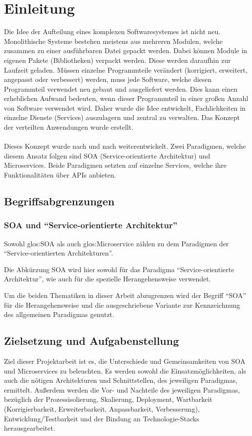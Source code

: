 \chapter{Einleitung}
\label{chap:Einleitung}
Die Idee der Aufteilung eines komplexen Softwaresystemes ist nicht neu. Monolithische Systeme bestehen meistens aus mehreren Modulen, welche zusammen zu einer ausführbaren Datei gepackt werden. Dabei können Module in eigenen Pakete (Bibliotheken) verpackt werden. Diese werden daraufhin zur Laufzeit geladen. Müssen einzelne Programmteile verändert (korrigiert, erweitert, angepasst oder verbessert) werden, muss jede Software, welche diesen Programmteil verwendet neu gebaut und ausgeliefert werden. Dies kann einen erheblichen Aufwand bedeuten, wenn dieser Programmteil in einer großen Anzahl von Software verwendet wird. Daher wurde die Idee entwickelt, Fachlichkeiten in einzelne Dienste (Services) auszulagern und zentral zu verwalten. Das Konzept der verteilten Anwendungen wurde erstellt.
\\\\
Dieses Konzept wurde nach und nach weiterentwickelt. Zwei Paradigmen, welche diesem Ansatz folgen sind SOA (Service-orientierte Architektur) und Microservices. Beide Paradigmen setzten auf einzelne Services, welche ihre Funktionalitäten über APIs anbieten.

\section{Begriffsabgrenzungen}
\label{sec:Begriffsabgrenzungen}

\subsection*{SOA und "`Service-orientierte Architektur"'}
Sowohl \gls{glos:SOA} als auch \gls{glos:Microservice} zählen zu dem Paradigmen der "`Service-orientierten Architekturen"'.

Die Abkürzung SOA wird hier sowohl für das Paradigma "`Service-orientierte Architektur"', wie auch für die spezielle Herangehensweise verwendet.

Um die beiden Thematiken in dieser Arbeit abzugrenzen wird der Begriff "`SOA"' für die Herangehensweise und die ausgeschriebene Variante zur Kennzeichnung des allgemeinen Paradigmas genutzt.

\section{Zielsetzung und Aufgabenstellung}
\label{sec:ZielsetzungUndAufgabenstellung}
Ziel dieser Projektarbeit ist es, die Unterschiede und Gemeinsamkeiten von SOA und Microservices zu beleuchten. Es werden sowohl die Einsatzmöglichkeiten, als auch die nötigen Architekturen und Schnittstellen, des jeweiligen Paradigmas, ermittelt. Außerdem werden die Vor- und Nachteile des jeweiligen Paradigmas, bezüglich der Prozessisolierung, Skalierung, Deployment, Wartbarkeit (Korrigierbarkeit, Erweiterbarkeit, Anpassbarkeit, Verbesserung), Entwicklung/Testbarkeit und der Bindung an Technologie-Stacks herausgearbeitet. 

